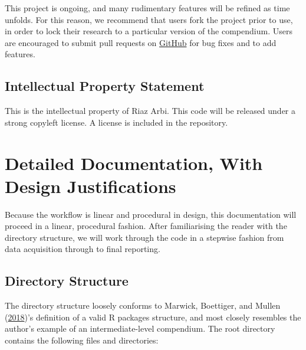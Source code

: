 \documentclass[11pt,preprint, authoryear]{elsarticle}
\numberwithin{equation}{section}
\numberwithin{figure}{section}
\numberwithin{table}{section}
\begin{document}
This project is ongoing, and many rudimentary features will be refined
as time unfolds. For this reason, we recommend that users fork the
project prior to use, in order to lock their research to a particular
version of the compendium. Users are encouraged to submit pull requests
on \href{https://github.com}{GitHub} for bug fixes and to add features.

\subsection{Intellectual Property
Statement}\label{intellectual-property-statement}

This is the intellectual property of Riaz Arbi. This code will be
released under a strong copyleft license. A license is included in the
repository.

\newpage

\section{Detailed Documentation, With Design
Justifications}\label{detailed-documentation-with-design-justifications}

Because the workflow is linear and procedural in design, this
documentation will proceed in a linear, procedural fashion. After
familiarising the reader with the directory structure, we will work
through the code in a stepwise fashion from data acquisition through to
final reporting.

\subsection{Directory Structure}\label{directory-structure}

The directory structure loosely conforms to Marwick, Boettiger, and
Mullen (\protect\hyperlink{ref-Marwick2018}{2018})'s definition of a
valid R packages structure, and most closely resembles the author's
example of an intermediate-level compendium. The root directory contains
the following files and directories:
\end{document}
